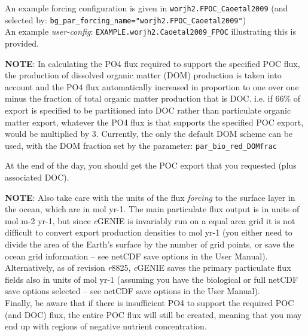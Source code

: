 \begin{enumerate}[noitemsep]
An example forcing configuration is given in \texttt{worjh2.FPOC\_Caoetal2009} (and selected by: \texttt{bg\_par\_forcing\_name="worjh2.FPOC\_Caoetal2009"})
\\An example \textit{user-config}: \texttt{EXAMPLE.worjh2.Caoetal2009\_FPOC} illustrating this is provided.

\vspace{1mm}
\noindent \textbf{NOTE}: In calculating the PO4 flux required to support the specified POC flux, the production of dissolved organic matter (DOM) production is taken into account and the PO4 flux automatically increased in proportion to one over one minus the fraction of total organic matter production that is DOC. i.e. if 66\% of export is specified to be partitioned into DOC rather than particulate organic matter export, whatever the PO4 flux is that supports the specified   POC export, would be multiplied by 3. Currently, the only the default DOM scheme can be used, with the DOM fraction set by the parameter: \texttt{par\_bio\_red\_DOMfrac}

At the end of the day, you should get the POC export that you requested (plus associated DOC).

\noindent \textbf{NOTE}: Also take care with the units of the flux \textit{forcing} to the surface layer in the ocean, which are in mol yr-1. The main particulate flux output is in units of mol m-2 yr-1, but since \textit{c}GENIE is invariably run on a equal area grid it is not difficult to convert export production densities to mol yr-1 (you either need to divide the area of the Earth's surface by the number of grid points, or save the ocean grid information -- see netCDF save options in the User Manual). Alternatively, as of revision \textit{r}8825, \textit{c}GENIE saves the primary particulate flux fields also in units of mol yr-1 (assuming you have the biological or full netCDF save options selected -- see netCDF save options in the User Manual).
\\Finally, be aware that if there is insufficient PO4 to support the required POC (and DOC) flux, the entire POC flux will still be created, meaning that you may end up with regions of negative nutrient concentration.

\end{enumerate}


\newpage


